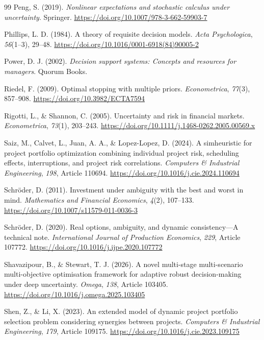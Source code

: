 \documentclass[5p,times,authoryear]{elsarticle}
\theoremstyle{plain}
\begin{document}
\begin{thebibliography}{99}
Peng, S. (2019). \emph{Nonlinear expectations and stochastic calculus under uncertainty}. Springer. \url{https://doi.org/10.1007/978-3-662-59903-7}

Phillips, L. D. (1984). A theory of requisite decision models. \emph{Acta Psychologica}, \emph{56}(1--3), 29--48. \url{https://doi.org/10.1016/0001-6918(84)90005-2}

Power, D. J. (2002). \emph{Decision support systems: Concepts and resources for managers}. Quorum Books.

Riedel, F. (2009). Optimal stopping with multiple priors. \emph{Econometrica}, \emph{77}(3), 857--908. \url{https://doi.org/10.3982/ECTA7594}

Rigotti, L., \& Shannon, C. (2005). Uncertainty and risk in financial markets. \emph{Econometrica}, \emph{73}(1), 203--243. \url{https://doi.org/10.1111/j.1468-0262.2005.00569.x}

Saiz, M., Calvet, L., Juan, A. A., \& Lopez-Lopez, D. (2024). A simheuristic for project portfolio optimization combining individual project risk, scheduling effects, interruptions, and project risk correlations. \emph{Computers \& Industrial Engineering}, \emph{198}, Article 110694. \url{https://doi.org/10.1016/j.cie.2024.110694}

Schr\"oder, D. (2011). Investment under ambiguity with the best and worst in mind. \emph{Mathematics and Financial Economics}, \emph{4}(2), 107--133. \url{https://doi.org/10.1007/s11579-011-0036-3}

Schr\"oder, D. (2020). Real options, ambiguity, and dynamic consistency---A technical note. \emph{International Journal of Production Economics}, \emph{229}, Article 107772. \url{https://doi.org/10.1016/j.ijpe.2020.107772}

Shavazipour, B., \& Stewart, T. J. (2026). A novel multi-stage multi-scenario multi-objective optimisation framework for adaptive robust decision-making under deep uncertainty. \emph{Omega}, \emph{138}, Article 103405. \url{https://doi.org/10.1016/j.omega.2025.103405}

Shen, Z., \& Li, X. (2023). An extended model of dynamic project portfolio selection problem considering synergies between projects. \emph{Computers \& Industrial Engineering}, \emph{179}, Article 109175. \url{https://doi.org/10.1016/j.cie.2023.109175}


\end{thebibliography}
\end{document}

